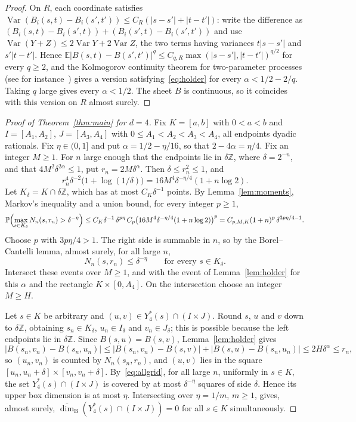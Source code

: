 \documentclass[11pt]{amsart}
\theoremstyle{remark}
\newcommand{\Z}{\mathbb{Z}}
\newcommand{\PP}{\mathbb{P}}
\newcommand{\E}{\mathbb{E}}
\newcommand{\Var}{\operatorname{Var}}
\newcommand{\dimB}{\overline{\dim}_{\mathrm B}}
\begin{document}
\begin{proof}
On $R$, each coordinate satisfies $\Var(B_i(s,t)-B_i(s',t'))\le C_R(|s-s'|+|t-t'|)$: write the difference as
$(B_i(s,t)-B_i(s',t))+(B_i(s',t)-B_i(s',t'))$ and use $\Var(Y+Z)\le2\Var Y+2\Var Z$, the two terms having variances
$t|s-s'|$ and $s'|t-t'|$. Hence $\E|B(s,t)-B(s',t')|^q\le C_{q,R}\max(|s-s'|,|t-t'|)^{q/2}$ for every $q\ge2$, and the
Kolmogorov continuity theorem for two-parameter processes (see for instance~\cite{Kho02}) gives a version
satisfying~\eqref{eq:holder} for every $\alpha<1/2-2/q$. Taking $q$ large gives every $\alpha<1/2$. The sheet $B$ is
continuous, so it coincides with this version on $R$ almost surely.
\end{proof}

\begin{proof}[Proof of Theorem~\ref{thm:main} for $d=4$]
Fix $K=[a,b]$ with $0<a<b$ and $I=[A_1,A_2]$, $J=[A_3,A_4]$ with $0\le A_1<A_2<A_3<A_4$, all endpoints dyadic rationals.
Fix $\eta\in(0,1]$ and put $\alpha=1/2-\eta/16$, so that $2-4\alpha=\eta/4$. Fix an integer $M\ge1$. For $n$ large
enough that the endpoints lie in $\delta\Z$, where $\delta=2^{-n}$, and that $4M^2\delta^{2\alpha}\le1$, put
$r_n=2M\delta^\alpha$. Then $\delta\le r_n^2\le1$, and
\[
r_n^4\delta^{-2}\bigl(1+\log(1/\delta)\bigr)=16M^4\delta^{-\eta/4}(1+n\log2).
\]
Let $K_\delta=K\cap\delta\Z$, which has at most $C_K\delta^{-1}$ points. By Lemma~\ref{lem:moments}, Markov's
inequality and a union bound, for every integer $p\ge1$,
\[
\PP\Bigl(\max_{s\in K_\delta}N_n(s,r_n)>\delta^{-\eta}\Bigr)\le C_K\delta^{-1}\,\delta^{p\eta}\,C_p\bigl(16M^4\delta^{-\eta/4}
(1+n\log2)\bigr)^p=C_{p,M,K}(1+n)^p\,\delta^{3p\eta/4-1}.
\]
Choose $p$ with $3p\eta/4>1$. The right side is summable in $n$, so by the Borel--Cantelli lemma, almost surely, for all
large $n$,
\begin{equation}\label{eq:allgrid}
N_n(s,r_n)\le\delta^{-\eta}\qquad\text{for every }s\in K_\delta.
\end{equation}
Intersect these events over $M\ge1$, and with the event of Lemma~\ref{lem:holder} for this $\alpha$ and the rectangle
$K\times[0,A_4]$. On the intersection choose an integer $M\ge H$.

Let $s\in K$ be arbitrary and $(u,v)\in Y^*_4(s)\cap(I\times J)$. Round $s$, $u$ and $v$ down to $\delta\Z$, obtaining
$s_n\in K_\delta$, $u_n\in I_\delta$ and $v_n\in J_\delta$; this is possible because the left endpoints lie in
$\delta\Z$. Since $B(s,u)=B(s,v)$, Lemma~\ref{lem:holder} gives
\[
|B(s_n,v_n)-B(s_n,u_n)|\le|B(s_n,v_n)-B(s,v)|+|B(s,u)-B(s_n,u_n)|\le2H\delta^\alpha\le r_n,
\]
so $(u_n,v_n)$ is counted by $N_n(s_n,r_n)$, and $(u,v)$ lies in the square $[u_n,u_n+\delta]\times[v_n,v_n+\delta]$.
By~\eqref{eq:allgrid}, for all large $n$, uniformly in $s\in K$, the set $Y^*_4(s)\cap(I\times J)$ is covered by at most
$\delta^{-\eta}$ squares of side $\delta$. Hence its upper box dimension is at most $\eta$. Intersecting over
$\eta=1/m$, $m\ge1$, gives, almost surely, $\dimB(Y^*_4(s)\cap(I\times J))=0$ for all $s\in K$ simultaneously.


\end{proof}
\end{document}
